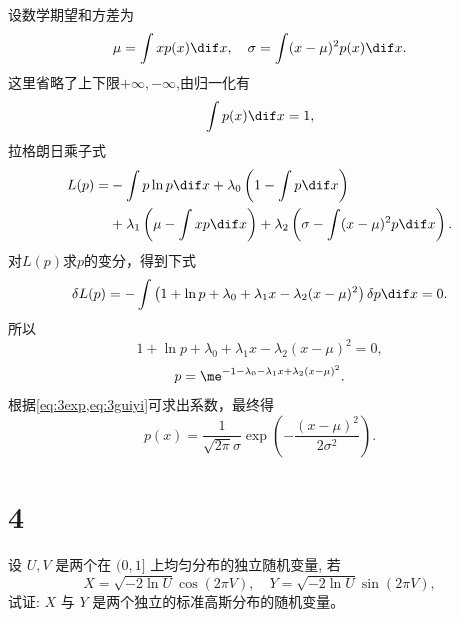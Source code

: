 \documentclass[12pt,a4]{ctexart}
\begin{document}
设数学期望和方差为
\begin{equation}
	\mu = \int x p(x) \dif x, \quad \sigma = \int (x-\mu)^2 p(x) \dif x.
	\label{eq:3exp}
\end{equation}
这里省略了上下限$+\infty,-\infty$,由归一化有
\begin{equation}
	\int p(x) \dif x = 1,
	\label{eq:3guiyi}
\end{equation}
拉格朗日乘子式
\begin{equation}
	\begin{aligned}
		L(p) = & - \int p \ln p \dif x + \lambda_0 \left(1- \int p \dif x\right)                                            \\
			   & + \lambda_1 \left( \mu - \int x p \dif x\right) + \lambda_2 \left(\sigma - \int (x-\mu)^2 p \dif x\right).
	\end{aligned}
\end{equation}
对$L(p)$求$p$的变分，得到下式
\begin{equation}
	\delta L(p)  = - \int \left( 1 + \ln p + \lambda_0 + \lambda_1 x - \lambda_2 (x-\mu)^2 \right) \delta p \dif x = 0.
\end{equation}
所以
\begin{equation}
	1 + \ln p + \lambda_0 + \lambda_1 x - \lambda_2 (x-\mu)^2 = 0,
\end{equation}
\begin{equation}
	p = \me^{-1-\lambda_0 - \lambda_1 x + \lambda_2 (x-\mu)^2}.
\end{equation}
根据\cref{eq:3exp,eq:3guiyi}可求出系数，最终得
\begin{equation}
	p(x)=\frac{1}{\sqrt{2 \pi} \sigma} \exp \left(-\frac{(x-\mu)^{2}}{2 \sigma^{2}}\right).
\end{equation}


\section{4}

设 $U, V$ 是两个在 $(0,1]$ 上均匀分布的独立随机变量, 若
\begin{equation}
	X=\sqrt{-2 \ln U} \cos (2 \pi V),\quad Y=\sqrt{-2 \ln U} \sin (2 \pi V),
\end{equation}
试证: $X$ 与 $Y$ 是两个独立的标准高斯分布的随机变量。
\end{document}
